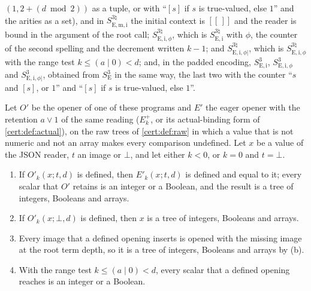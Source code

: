 $(1,2+(d\bmod 2))$ as a tuple, or with ``$[s]$ if $s$ is true-valued, else $1$'' and the
arities as a set), and in $S^{3\natural}_{\mathrm{E,m,i}}$ the initial context is $[[\,]]$ and
the reader is bound in the argument of the root call;
$S^{3\natural}_{\mathrm{E,i},\phi}$, which is $S^{3\natural}_{\mathrm{E,i}}$ with $\phi$, the
counter of the second spelling and the decrement written $k-1$; and
$S^{3\natural}_{\mathrm{E,i},\phi|}$, which is $S^{3\natural}_{\mathrm{E,i},\phi}$ with the range
test $k\le(a\mathbin{|}0)<d$; and, in the padded encoding, $S^{3}_{\mathrm{E,i}}$,
$S^{3}_{\mathrm{E,i},\phi}$ and $S^{3}_{\mathrm{E,i},\phi|}$, obtained from $S^{3}_{\mathrm E}$
in the same way, the last two with the counter ``$s$ and $[s]$, or $1$'' and ``$[s]$ if $s$
is true-valued, else $1$''.

\begin{lemma}\label{cert:lem:local-validation}
Let $O'$ be the opener of one of these programs and $E'$ the eager opener with the retention
$a\lor 1$ of the same reading ($E^{+}_k$, or its actual-binding form of
\cref{cert:def:actual}), on the raw trees of \cref{cert:def:raw} in which a value that is not
numeric and not an array makes every comparison undefined. Let $x$ be a value of the JSON
reader, $t$ an image or $\bot$, and let either $k<0$, or $k=0$ and $t=\bot$.
\begin{enumerate}[label=(\alph*)]
\item If $O'_k(x;t,d)$ is defined, then $E'_k(x;t,d)$ is defined and equal to it; every
scalar that $O'$ retains is an integer or a Boolean, and the result is a tree of integers,
Booleans and arrays.
\item If $O'_k(x;\bot,d)$ is defined, then $x$ is a tree of integers, Booleans and arrays.
\item Every image that a defined opening inserts is opened with the missing image at the
root term depth, so it is a tree of integers, Booleans and arrays by (b).
\item With the range test $k\le(a\mathbin{|}0)<d$, every scalar that a defined opening
reaches is an integer or a Boolean.
\end{enumerate}
\end{lemma}
